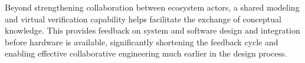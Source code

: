 Beyond strengthening collaboration between ecosystem actors, a shared modeling and virtual verification capability helps 
facilitate the exchange of conceptual knowledge. 
This provides feedback on system and software design and integration before hardware is available, significantly shortening the feedback cycle and enabling effective collaborative engineering much earlier in the design process.


